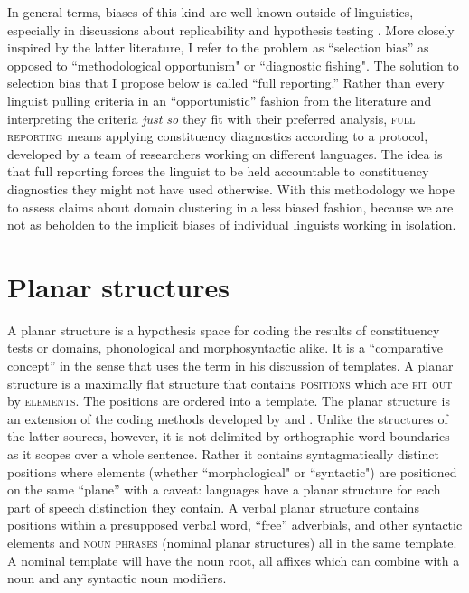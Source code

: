 \documentclass[output=paper,hidelinks]{langscibook}
\begin{document}
In general terms, biases of this kind are well-known outside of linguistics, especially in discussions about replicability and hypothesis testing \citep{risen2006informal, nosek:preregistration, mayo2018statistical}. More closely inspired by the latter literature, I refer to the problem as ``selection bias'' \citep{tallman2021analysis} as opposed to ``methodological opportunism" or ``diagnostic fishing". The solution to selection bias that I propose below is called ``full reporting.'' Rather than every linguist pulling criteria in an ``opportunistic'' fashion from the literature and interpreting the criteria \textit{just so} they fit with their preferred analysis, \textsc{full reporting} means applying constituency diagnostics according to a protocol, developed by a team of researchers working on different languages. The idea is that full reporting forces the linguist to be held accountable to constituency diagnostics they might not have used otherwise. With this methodology we hope to assess claims about domain clustering in a less biased fashion, because we are not as beholden to the implicit biases of individual linguists working in isolation.


\section{Planar structures}
\label{sec:planartsructures}
\largerpage
A planar structure is a hypothesis space for coding the results of constituency tests or domains, phonological and morphosyntactic alike. It is a ``comparative concept'' in the sense that \citet{good2016linguistic} uses the term in his discussion of templates. A planar structure is a maximally flat structure that contains \textsc{positions} which are \textsc{fit out} by \textsc{elements}. The positions are ordered into a template. The planar structure is an extension of the coding methods developed by \citet{bickel2009distribution} and \citet{Bickel2017}. Unlike the structures of the latter sources, however, it is not delimited by orthographic word boundaries as it scopes over a whole sentence. Rather it contains syntagmatically distinct positions where elements (whether ``morphological" or ``syntactic") are positioned on the same ``plane'' with a caveat: languages have a planar structure for each part of speech distinction they contain. A verbal planar structure contains positions within a presupposed verbal word, ``free'' adverbials, and other syntactic elements and \textsc{noun phrases} (nominal planar structures) all in the same template. A nominal template will have the noun root, all affixes which can combine with a noun and any syntactic noun modifiers.
\end{document}
